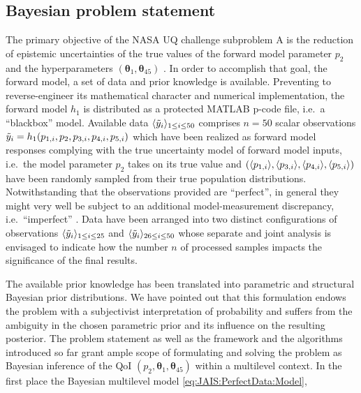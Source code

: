 \subsection{Bayesian problem statement}
The primary objective of the NASA UQ challenge subproblem A is the reduction of epistemic uncertainties
of the true values of the forward model parameter \(p_2\) and the hyperparameters \((\bm{\theta}_1,\bm{\theta}_{45})\) \cite{NASA:Crespo2014:Proc}.
In order to accomplish that goal, the forward model, a set of data and prior knowledge is available.
Preventing to reverse-engineer its mathematical character and numerical implementation, the forward model \(h_1\) is distributed as a protected MATLAB p-code file, i.e.\ a ``blackbox'' model.
Available data \(\langle{\tilde{y}_i}\rangle_{1 \leq i \leq 50}\) comprises \(n = 50\) scalar observations \(\tilde{y}_i = h_1(p_{1,i},p_2,p_{3,i},p_{4,i},p_{5,i})\)
which have been realized as forward model responses complying with the true uncertainty model of forward model inputs, i.e.\
the model parameter \(p_2\) takes on its true value and \((\langle{p_{1,i}}\rangle,\langle{p_{3,i}}\rangle,\langle{p_{4,i}}\rangle,\langle{p_{5,i}}\rangle)\) have been randomly sampled from their true population distributions.
Notwithstanding that the observations provided are ``perfect'', in general they might very well be subject to an additional model-measurement discrepancy, i.e.\ ``imperfect'' \cite{NASA:Crespo2013:FAQ:URL}.
Data have been arranged into two distinct configurations of observations \(\langle{\tilde{y}_i}\rangle_{1 \leq i \leq 25}\) and \(\langle{\tilde{y}_i}\rangle_{26 \leq i \leq 50}\)
whose separate and joint analysis is envisaged to indicate how the number \(n\) of processed samples impacts the significance of the final results.
\par %
The available prior knowledge has been translated into parametric and structural Bayesian prior distributions.
We have pointed out that this formulation endows the problem with a subjectivist interpretation of probability
and suffers from the ambiguity in the chosen parametric prior and its influence on the resulting posterior.
The problem statement as well as the framework and the algorithms introduced so far grant ample scope
of formulating and solving the problem as Bayesian inference of the QoI \((p_2,\bm{\theta}_1,\bm{\theta}_{45})\) within a multilevel context.
In the first place the Bayesian multilevel model \cref{eq:JAIS:PerfectData:Model},
